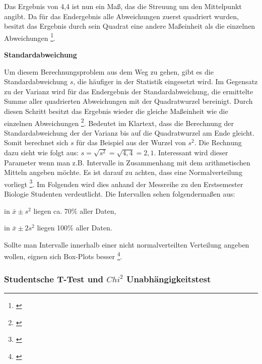 Das Ergebnis von 4,4 ist nun ein Maß, das die Streuung um den Mittelpunkt angibt. Da für das Endergebnis alle Abweichungen zuerst quadriert wurden, besitzt das Ergebnis durch sein Quadrat eine andere Maßeinheit als die einzelnen Abweichungen \footnote{\cite[vgl.][65]{Fahrmeir2016}}.

\textbf{Standardabweichung}

Um diesem Berechnungsproblem aus dem Weg zu gehen, gibt es die Standardabweichung $s$, die häufiger in der Statistik eingesetzt wird. Im Gegensatz zu der Varianz wird für das Endergebnis der Standardabweichung, die ermittelte Summe aller quadrierten Abweichungen mit der Quadratwurzel bereinigt. Durch diesen Schritt besitzt das Ergebnis wieder die gleiche Maßeinheit wie die einzelnen Abweichungen \footnote{\cite[vgl.][65]{Fahrmeir2016}}. Bedeutet im Klartext, dass die Berechnung der Standardabweichung der der Varianz bis auf die Quadratwurzel am Ende gleicht. Somit berechnet sich $s$ für das Beispiel aus der Wurzel von $s^2$. Die Rechnung dazu sieht wie folgt aus: $s = \sqrt{s^2} = \sqrt{4,4} = 2,1$. Interessant wird dieser Parameter wenn man z.B. Intervalle in Zusammenhang mit dem arithmetischen Mitteln angeben möchte. Es ist darauf zu achten, dass eine Normalverteilung vorliegt \footnote{\cite[vgl.][67]{Fahrmeir2016}}. Im Folgenden wird dies anhand der Messreihe zu den Erstsemester Biologie Studenten verdeutlicht. Die Intervallen sehen folgendermaßen aus:
\begin{compactitem}
    \item in $\bar{x} \pm s^2$ liegen ca. 70\% aller Daten,
    \item in $\bar{x} \pm 2s^2$ liegen 100\% aller Daten. 
\end{compactitem}
Sollte man Intervalle innerhalb einer nicht normalverteilten Verteilung angeben wollen, eignen sich Box-Plots besser \footnote{\cite[vgl.][67]{Fahrmeir2016}}.


\subsubsection{Studentsche T-Test und $Chi^2$ Unabhängigkeitstest}




